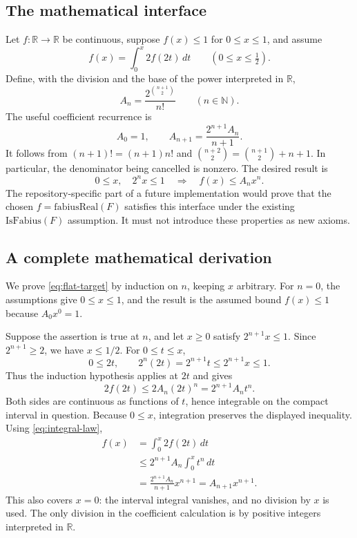 \documentclass[11pt,a4paper]{article}
\newcommand{\R}{\mathbb R}
\newcommand{\N}{\mathbb N}
\theoremstyle{definition}
\theoremstyle{remark}
\begin{document}
\subsection{The mathematical interface}
Let $f:\R\to\R$ be continuous, suppose $f(x)\le1$ for $0\le x\le1$, and assume
\begin{equation}
 f(x)=\int_0^x 2f(2t)\,dt
 \qquad (0\le x\le \tfrac12).
 \label{eq:integral-law}
\end{equation}
Define, with the division and the base of the power interpreted in $\R$,
\begin{equation}
 A_n=\frac{2^{\binom{n+1}{2}}}{n!}\qquad(n\in\N).
 \label{eq:A}
\end{equation}
The useful coefficient recurrence is
\begin{equation}
 A_0=1,\qquad A_{n+1}=\frac{2^{n+1}A_n}{n+1}.
 \label{eq:A-rec}
\end{equation}
It follows from $(n+1)!=(n+1)n!$ and
$\binom{n+2}{2}=\binom{n+1}{2}+n+1$. In particular, the denominator being cancelled is nonzero. The desired result is
\begin{equation}
 0\le x,\quad 2^n x\le1
 \quad\Longrightarrow\quad
 f(x)\le A_n x^n.
 \label{eq:flat-target}
\end{equation}
The repository-specific part of a future implementation would prove that the chosen $f=\mathrm{fabiusReal}(F)$ satisfies this interface under the existing $\mathrm{IsFabius}(F)$ assumption. It must not introduce these properties as new axioms.

\subsection{A complete mathematical derivation}
We prove \eqref{eq:flat-target} by induction on $n$, keeping $x$ arbitrary. For $n=0$, the assumptions give $0\le x\le1$, and the result is the assumed bound $f(x)\le1$ because $A_0x^0=1$.

Suppose the assertion is true at $n$, and let $x\ge0$ satisfy $2^{n+1}x\le1$. Since $2^{n+1}\ge2$, we have $x\le1/2$. For $0\le t\le x$,
\[
 0\le2t,\qquad 2^n(2t)=2^{n+1}t
 \le2^{n+1}x\le1.
\]
Thus the induction hypothesis applies at $2t$ and gives
\begin{equation}
 2f(2t)\le2A_n(2t)^n=2^{n+1}A_nt^n.
 \label{eq:integrand-bound}
\end{equation}
Both sides are continuous as functions of $t$, hence integrable on the compact interval in question. Because $0\le x$, integration preserves the displayed inequality. Using \eqref{eq:integral-law},
\begin{align*}
 f(x)
 &=\int_0^x 2f(2t)\,dt\\
 &\le2^{n+1}A_n\int_0^x t^n\,dt\\
 &=\frac{2^{n+1}A_n}{n+1}x^{n+1}
 =A_{n+1}x^{n+1}.
\end{align*}
This also covers $x=0$: the interval integral vanishes, and no division by $x$ is used. The only division in the coefficient calculation is by positive integers interpreted in $\R$.
\end{document}
